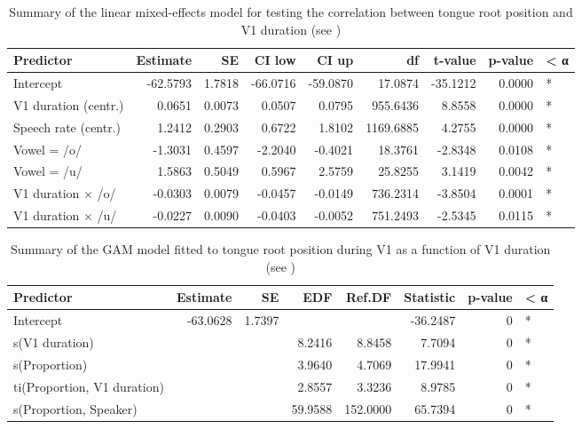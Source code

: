 \documentclass[
  12pt,
]{article}
\begin{document}
\begin{table}[t]

\caption{\label{tab:tra-lm-2-table}Summary of the linear mixed-effects model for testing the correlation between tongue root position and V1 duration  (see )}
\centering
\fontsize{10}{12}\selectfont
\begin{tabular}{lrrrrrrrl}
\toprule
Predictor & Estimate & SE & CI low & CI up & df & t-value & p-value & < α\\
\midrule
Intercept & -62.5793 & 1.7818 & -66.0716 & -59.0870 & 17.0874 & -35.1212 & 0.0000 & *\\
V1 duration (centr.) & 0.0651 & 0.0073 & 0.0507 & 0.0795 & 955.6436 & 8.8558 & 0.0000 & *\\
Speech rate (centr.) & 1.2412 & 0.2903 & 0.6722 & 1.8102 & 1169.6885 & 4.2755 & 0.0000 & *\\
Vowel = /o/ & -1.3031 & 0.4597 & -2.2040 & -0.4021 & 18.3761 & -2.8348 & 0.0108 & *\\
Vowel = /u/ & 1.5863 & 0.5049 & 0.5967 & 2.5759 & 25.8255 & 3.1419 & 0.0042 & *\\
V1 duration × /o/ & -0.0303 & 0.0079 & -0.0457 & -0.0149 & 736.2314 & -3.8504 & 0.0001 & *\\
V1 duration × /u/ & -0.0227 & 0.0090 & -0.0403 & -0.0052 & 751.2493 & -2.5345 & 0.0115 & *\\
\bottomrule
\end{tabular}
\end{table}

\begin{table}[t]

\caption{\label{tab:tra-gam-ar-2-table}Summary of the GAM model fitted to tongue root position during V1 as a function of V1 duration (see )}
\centering
\fontsize{10}{12}\selectfont
\begin{tabular}{lrrrrrrl}
\toprule
Predictor & Estimate & SE & EDF & Ref.DF & Statistic & p-value & < α\\
\midrule
Intercept & -63.0628 & 1.7397 &  &  & -36.2487 & 0 & *\\
s(V1 duration) &  &  & 8.2416 & 8.8458 & 7.7094 & 0 & *\\
s(Proportion) &  &  & 3.9640 & 4.7069 & 17.9941 & 0 & *\\
ti(Proportion, V1 duration) &  &  & 2.8557 & 3.3236 & 8.9785 & 0 & *\\
s(Proportion, Speaker) &  &  & 59.9588 & 152.0000 & 65.7394 & 0 & *\\
\bottomrule
\end{tabular}
\end{table}

  
\end{document}
